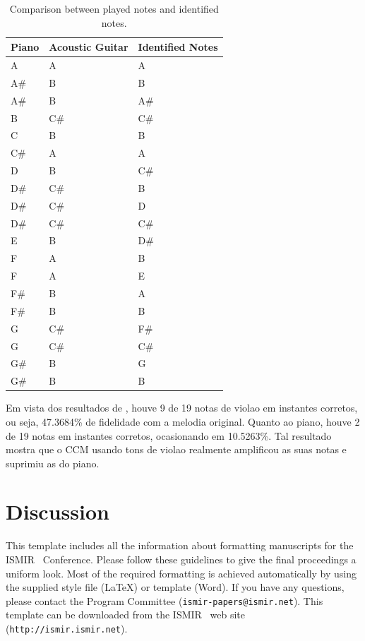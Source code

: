 \documentclass{article}
\begin{document}
	\begin{table}[h]
	 \begin{center}
	 \begin{tabular}{|l|l|l|}
	  \hline
	  Piano & Acoustic Guitar & Identified Notes \\
	  \hline
			  A & A &  A \\
		A\# &  B &  B \\
		    A\# &  B &    A\# \\
		    B  &   C\# &  C\# \\
		    C   &  B  &   B \\
		    C\# &  A   &  A \\
		    D   &  B   &  C\# \\
		    D\# &  C\# &  B \\
		    D\# &  C\# &  D \\
		    D\# &  C\# &  C\# \\
		    E   &  B  &   D\# \\
		    F   &  A   &  B \\
		    F   &  A  &   E \\
		    F\# &  B  &   A \\
		    F\# &  B   &  B \\
		    G   &  C\# &  F\# \\
		    G   &  C\# &  C\# \\
		    G\# &  B   &  G \\
		    G\# &  B  &   B \\
	  \hline
	 \end{tabular}
	\end{center}
	 \caption{Comparison between played notes and identified notes.}
	 \label{tab:table-2-ccm-violao}
	\end{table}

	\newpage
	Em vista dos resultados de , houve 9 de 19 notas de violao em instantes corretos, ou seja, 47.3684\% de fidelidade com a melodia original. Quanto ao piano, houve 2 de 19 notas em instantes corretos, ocasionando em 10.5263\%. Tal resultado mostra que o CCM usando tons de violao realmente amplificou as suas notas e suprimiu as do piano.


\section{Discussion}\label{sec:discussion}

	This template includes all the information about formatting manuscripts for the ISMIR \conferenceyear\ Conference.
	Please follow these guidelines to give the final proceedings a uniform look.
	Most of the required formatting is achieved automatically by using the supplied
	style file (\LaTeX) or template (Word).
	If you have any questions, please contact the Program Committee
	(\texttt{ismir\conferenceyear-papers@ismir.net}).
	This template can be downloaded from the ISMIR \conferenceyear\ web site (\texttt{http://ismir\conferenceyear.ismir.net}).
\end{document}
